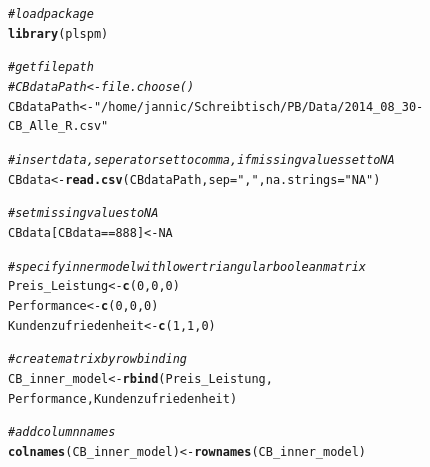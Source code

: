 \documentclass{article}\usepackage[]{graphicx}\usepackage[]{color}
\makeatletter
\newcommand{\hlnum}[1]{\textcolor[rgb]{0.686,0.059,0.569}{#1}}%
\newcommand{\hlstr}[1]{\textcolor[rgb]{0.192,0.494,0.8}{#1}}%
\newcommand{\hlcom}[1]{\textcolor[rgb]{0.678,0.584,0.686}{\textit{#1}}}%
\newcommand{\hlopt}[1]{\textcolor[rgb]{0,0,0}{#1}}%
\newcommand{\hlstd}[1]{\textcolor[rgb]{0.345,0.345,0.345}{#1}}%
\newcommand{\hlkwb}[1]{\textcolor[rgb]{0.69,0.353,0.396}{#1}}%
\newcommand{\hlkwc}[1]{\textcolor[rgb]{0.333,0.667,0.333}{#1}}%
\newcommand{\hlkwd}[1]{\textcolor[rgb]{0.737,0.353,0.396}{\textbf{#1}}}%
\newenvironment{kframe}{%
 \def\at@end@of@kframe{}%
 \ifinner\ifhmode%
  \def\at@end@of@kframe{\end{minipage}}%
  \begin{minipage}{\columnwidth}%
 \fi\fi%
 \def\FrameCommand##1{\hskip\@totalleftmargin \hskip-\fboxsep
 \colorbox{shadecolor}{##1}\hskip-\fboxsep
     \hskip-\linewidth \hskip-\@totalleftmargin \hskip\columnwidth}%
 \MakeFramed {\advance\hsize-\width
   \@totalleftmargin\z@ \linewidth\hsize
   \@setminipage}}%
 {\par\unskip\endMakeFramed%
 \at@end@of@kframe}
\newenvironment{knitrout}{}{} %
\makeatother
\begin{document}
\begin{knitrout}
\color{fgcolor}\begin{kframe}
\begin{alltt}
\hlcom{#load package}
\hlkwd{library}\hlstd{(plspm)}

\hlcom{#get filepath}
\hlcom{#CBdataPath <- file.choose()}
\hlstd{CBdataPath} \hlkwb{<-} \hlstr{"/home/jannic/Schreibtisch/PB/Data/2014_08_30-CB_Alle_R.csv"}

\hlcom{#insert data, seperator set to comma, if missing values set to NA}
\hlstd{CBdata} \hlkwb{<-} \hlkwd{read.csv}\hlstd{(CBdataPath,} \hlkwc{sep} \hlstd{=}\hlstr{","}\hlstd{,}\hlkwc{na.strings}\hlstd{=}\hlstr{"NA"}\hlstd{)}

\hlcom{#set missing values to NA}
\hlstd{CBdata[CBdata} \hlopt{==} \hlnum{888}\hlstd{]} \hlkwb{<-} \hlnum{NA}

\hlcom{#specify inner model with lower triangular boolean matrix}
\hlstd{Preis_Leistung} \hlkwb{<-} \hlkwd{c}\hlstd{(}\hlnum{0}\hlstd{,}\hlnum{0}\hlstd{,}\hlnum{0}\hlstd{)}
\hlstd{Performance} \hlkwb{<-} \hlkwd{c}\hlstd{(}\hlnum{0}\hlstd{,}\hlnum{0}\hlstd{,}\hlnum{0}\hlstd{)}
\hlstd{Kundenzufriedenheit} \hlkwb{<-} \hlkwd{c}\hlstd{(}\hlnum{1}\hlstd{,}\hlnum{1}\hlstd{,}\hlnum{0}\hlstd{)}


\hlcom{#create matrix by row binding}
\hlstd{CB_inner_model} \hlkwb{<-} \hlkwd{rbind}\hlstd{(Preis_Leistung,}
                        \hlstd{Performance, Kundenzufriedenheit)}

\hlcom{#add column names }
\hlkwd{colnames}\hlstd{(CB_inner_model)} \hlkwb{<-} \hlkwd{rownames}\hlstd{(CB_inner_model)}


\end{alltt}
\end{kframe}
\end{knitrout}
\end{document}
